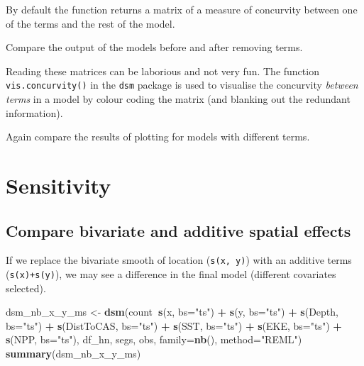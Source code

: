 \documentclass[]{book}
\newenvironment{Shaded}{\begin{snugshade}}{\end{snugshade}}
\newcommand{\KeywordTok}[1]{\textcolor[rgb]{0.13,0.29,0.53}{\textbf{#1}}}
\newcommand{\DataTypeTok}[1]{\textcolor[rgb]{0.13,0.29,0.53}{#1}}
\newcommand{\StringTok}[1]{\textcolor[rgb]{0.31,0.60,0.02}{#1}}
\newcommand{\OperatorTok}[1]{\textcolor[rgb]{0.81,0.36,0.00}{\textbf{#1}}}
\newcommand{\NormalTok}[1]{#1}
\theoremstyle{definition}
\theoremstyle{definition}
\theoremstyle{remark}
\begin{document}
By default the function returns a matrix of a measure of concurvity
between one of the terms and the rest of the model.

Compare the output of the models before and after removing terms.

Reading these matrices can be laborious and not very fun. The function
\texttt{vis.concurvity()} in the \texttt{dsm} package is used to
visualise the concurvity \emph{between terms} in a model by colour
coding the matrix (and blanking out the redundant information).

Again compare the results of plotting for models with different terms.

\section{Sensitivity}\label{sensitivity}

\subsection{Compare bivariate and additive spatial
effects}\label{compare-bivariate-and-additive-spatial-effects}

If we replace the bivariate smooth of location (\texttt{s(x,\ y)}) with
an additive terms (\texttt{s(x)+s(y)}), we may see a difference in the
final model (different covariates selected).

\begin{Shaded}
\begin{Highlighting}[]
\NormalTok{dsm_nb_x_y_ms <-}\StringTok{ }\KeywordTok{dsm}\NormalTok{(count}\OperatorTok{~}\KeywordTok{s}\NormalTok{(x, }\DataTypeTok{bs=}\StringTok{"ts"}\NormalTok{) }\OperatorTok{+}
\StringTok{                        }\KeywordTok{s}\NormalTok{(y, }\DataTypeTok{bs=}\StringTok{"ts"}\NormalTok{) }\OperatorTok{+}
\StringTok{                        }\KeywordTok{s}\NormalTok{(Depth, }\DataTypeTok{bs=}\StringTok{"ts"}\NormalTok{) }\OperatorTok{+}
\StringTok{                        }\KeywordTok{s}\NormalTok{(DistToCAS, }\DataTypeTok{bs=}\StringTok{"ts"}\NormalTok{) }\OperatorTok{+}
\StringTok{                        }\KeywordTok{s}\NormalTok{(SST, }\DataTypeTok{bs=}\StringTok{"ts"}\NormalTok{) }\OperatorTok{+}
\StringTok{                        }\KeywordTok{s}\NormalTok{(EKE, }\DataTypeTok{bs=}\StringTok{"ts"}\NormalTok{) }\OperatorTok{+}
\StringTok{                        }\KeywordTok{s}\NormalTok{(NPP, }\DataTypeTok{bs=}\StringTok{"ts"}\NormalTok{),}
\NormalTok{                  df_hn, segs, obs,}
                  \DataTypeTok{family=}\KeywordTok{nb}\NormalTok{(), }\DataTypeTok{method=}\StringTok{"REML"}\NormalTok{)}
\KeywordTok{summary}\NormalTok{(dsm_nb_x_y_ms)}
\end{Highlighting}
\end{Shaded}
\end{document}
